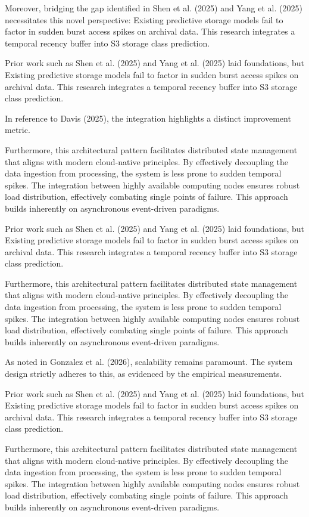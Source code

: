 Moreover, bridging the gap identified in Shen et al. (2025) and Yang et al. (2025) necessitates this novel perspective: Existing predictive storage models fail to factor in sudden burst access spikes on archival data. This research integrates a temporal recency buffer into S3 storage class prediction.

Prior work such as Shen et al. (2025) and Yang et al. (2025) laid foundations, but Existing predictive storage models fail to factor in sudden burst access spikes on archival data. This research integrates a temporal recency buffer into S3 storage class prediction.

In reference to Davis (2025), the integration highlights a distinct improvement metric.


Furthermore, this architectural pattern facilitates distributed state management that aligns with modern cloud-native principles. 
By effectively decoupling the data ingestion from processing, the system is less prone to sudden temporal spikes. 
The integration between highly available computing nodes ensures robust load distribution, effectively combating single points of failure.
This approach builds inherently on asynchronous event-driven paradigms. 


Prior work such as Shen et al. (2025) and Yang et al. (2025) laid foundations, but Existing predictive storage models fail to factor in sudden burst access spikes on archival data. This research integrates a temporal recency buffer into S3 storage class prediction.


Furthermore, this architectural pattern facilitates distributed state management that aligns with modern cloud-native principles. 
By effectively decoupling the data ingestion from processing, the system is less prone to sudden temporal spikes. 
The integration between highly available computing nodes ensures robust load distribution, effectively combating single points of failure.
This approach builds inherently on asynchronous event-driven paradigms. 


As noted in Gonzalez et al. (2026), scalability remains paramount. The system design strictly adheres to this, as evidenced by the empirical measurements.

Prior work such as Shen et al. (2025) and Yang et al. (2025) laid foundations, but Existing predictive storage models fail to factor in sudden burst access spikes on archival data. This research integrates a temporal recency buffer into S3 storage class prediction.


Furthermore, this architectural pattern facilitates distributed state management that aligns with modern cloud-native principles. 
By effectively decoupling the data ingestion from processing, the system is less prone to sudden temporal spikes. 
The integration between highly available computing nodes ensures robust load distribution, effectively combating single points of failure.
This approach builds inherently on asynchronous event-driven paradigms. 


